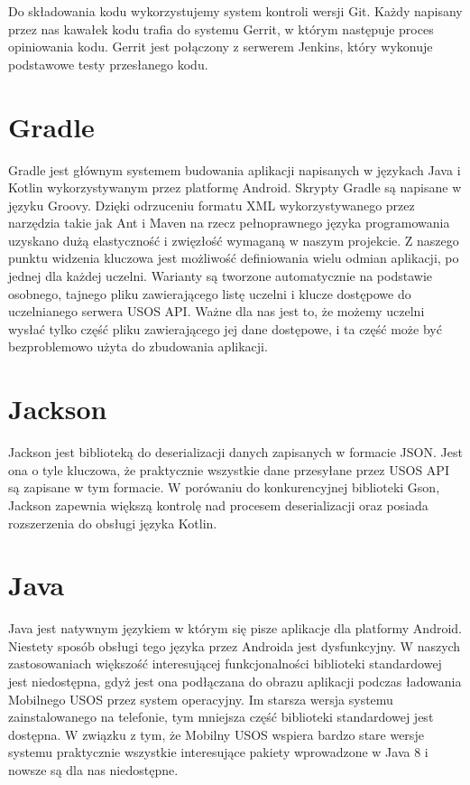 \documentclass{pracamgr}
\begin{document}
Do składowania kodu wykorzystujemy system kontroli wersji Git. Każdy napisany
przez nas kawałek kodu trafia do systemu Gerrit, w którym następuje proces
opiniowania kodu. Gerrit jest połączony z serwerem Jenkins, który wykonuje
podstawowe testy przesłanego kodu.

\section{Gradle}

Gradle jest głównym systemem budowania aplikacji napisanych w językach Java i
Kotlin wykorzystywanym przez platformę Android. Skrypty Gradle są napisane w
języku Groovy. Dzięki odrzuceniu formatu XML wykorzystywanego przez narzędzia
takie jak Ant i Maven na rzecz pełnoprawnego języka programowania uzyskano dużą
elastyczność i zwięzłość wymaganą w naszym projekcie. Z naszego punktu widzenia
kluczowa jest możliwość definiowania wielu odmian aplikacji, po jednej dla każdej
uczelni. Warianty są tworzone automatycznie na podstawie osobnego, tajnego pliku
zawierającego listę uczelni i klucze dostępowe do uczelnianego serwera USOS API.
Ważne dla nas jest to, że możemy uczelni wysłać tylko część pliku zawierającego
jej dane dostępowe, i ta część może być bezproblemowo użyta do zbudowania aplikacji.

\section{Jackson}

Jackson jest biblioteką do deserializacji danych zapisanych w formacie JSON.
Jest ona o tyle kluczowa, że praktycznie wszystkie dane przesyłane przez USOS API
są zapisane w tym formacie. W porówaniu do konkurencyjnej biblioteki Gson, Jackson
zapewnia większą kontrolę nad procesem deserializacji oraz posiada rozszerzenia
do obsługi języka Kotlin.

\section{Java}

Java jest natywnym językiem w którym się pisze aplikacje dla platformy Android.
Niestety sposób obsługi tego języka przez Androida jest dysfunkcyjny. W naszych
zastosowaniach większość interesującej funkcjonalności biblioteki standardowej
jest niedostępna, gdyż jest ona podłączana do obrazu aplikacji podczas ładowania
Mobilnego USOS przez system operacyjny. Im starsza wersja systemu zainstalowanego
na telefonie, tym mniejsza część biblioteki standardowej jest dostępna. W związku
z tym, że Mobilny USOS wspiera bardzo stare wersje systemu praktycznie wszystkie
interesujące pakiety wprowadzone w Java 8 i nowsze są dla nas niedostępne.
\end{document}
